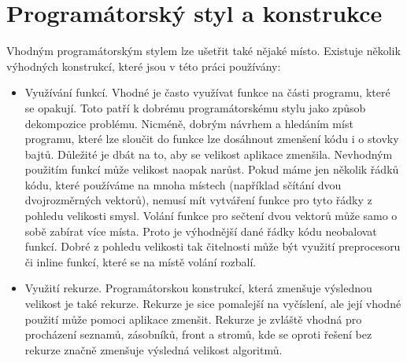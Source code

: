 \section{Programátorský styl a konstrukce}
Vhodným programátorským stylem lze ušetřit také nějaké místo.
Existuje několik vý\-hod\-ných konstrukcí, které jsou v této práci používány:
\begin{itemize}
\item
Využívání funkcí.
Vhodné je často využívat funkce na části programu, které se opakují.
Toto patří k dobrému programátorskému stylu jako způsob dekompozice problému.
Nicméně, dobrým návrhem a hledáním míst programu, které lze sloučit do funkce lze dosáhnout zmenšení kódu i o stovky bajtů.
Důležité je dbát na to, aby se velikost aplikace zmenšila.
Nevhodným použitím funkcí může velikost naopak narůst.
Pokud máme jen několik řádků kódu, které používáme na mnoha místech (například sčítání dvou dvojrozměrných vektorů), nemusí mít vytváření funkce pro tyto řádky z pohledu velikosti smysl.
Volání funkce pro sečtení dvou vektorů může samo o sobě zabírat více místa.
Proto je výhodnější dané řádky kódu neobalovat funkcí.
Dobré z pohledu velikosti tak čitelnosti může být využití preprocesoru či inline funkcí, které se na místě volání rozbalí.

\item
Využití rekurze.
Programátorskou konstrukcí, která zmenšuje výslednou velikost je také rekurze.
Rekurze je sice pomalejší na vyčíslení, ale její vhodné použití může pomoci aplikace zmenšit.
Rekurze je zvláště vhodná pro procházení seznamů, zásobníků, front a stromů, kde se oproti řešení bez rekurze značně zmenšuje výsledná velikost algoritmů.


\end{itemize}
